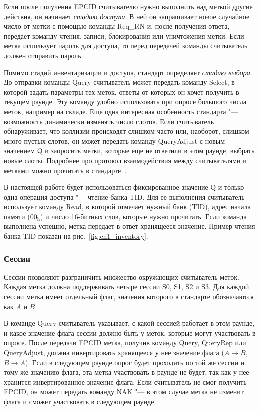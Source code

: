 Если после получения EPCID считывателю нужно выполнить над меткой другие действия, он начинает \textit{стадию доступа}. В ней он запрашивает новое случайное число от метки с помощью команды Req\_RN и, после получения ответа, передает команду чтения, записи, блокирования или уничтожения метки. Если метка использует пароль для доступа, то перед передачей команды считыватель должен отправить пароль.

Помимо стадий инвентаризации и доступа, стандарт определяет \textit{стадию выбора}. До отправки команды Query считыватель может передать команду Select, в которой задать параметры тех меток, ответы от которых он хочет получить в текущем раунде. Эту команду удобно использовать при опросе большого числа меток, например на складе. Еще одна интересная особенность стандарта "--- возможность динамически изменять число слотов. Если считыватель обнаруживает, что коллизии происходят слишком часто или, наоборот, слишком много пустых слотов, он может передать команду QueryAdjust с новым значением Q и запросить метки, которые еще не ответили в этом раунде, выбрать новые слоты. Подробнее про протокол взаимодействия между считывателями и метками можно прочитать в стандарте~\cite{StdGen2}.

В настоящей работе будет использоваться фиксированное значение Q и только одна операция доступа "--- чтение банка TID. Для ее выполнения считыватель использует команду Read, в которой отмечает нужный банк (TID), адрес начала памяти ($\text{00}_\text{h}$) и число 16-битных слов, которые нужно прочитать. Если команда выполнена успешно, метка передает в ответ хранящееся значение. Пример чтения банка TID показан на рис.~\ref{fig:ch1_inventory}.



\subsubsection{Сессии}

Сессии позволяют разграничить множество окружающих считыватель меток. Каждая метка должна поддерживать четыре сессии S0, S1, S2 и S3. Для каждой сессии метка имеет отдельный флаг, значения которого в стандарте обозначаются как $A$ и $B$.

В команде Query считыватель указывает, с какой сессией работает в этом раунде, и какое значение флага сессии должно быть у меток, которые могут участвовать в опросе. После передачи EPCID метка, получив команду Query, QueryRep или QueryAdjust, должна инвертировать хранящееся у нее значение флага ($A \rightarrow B$, $B \rightarrow A$). Если в следующем раунде опрос будет проходить по той же сессии и тому же значению флага, эта метка участвовать в раунде не будет, так как у нее хранится инвертированное значение флага. Если считыватель не смог получить EPCID, он может передать команду NAK "--- в этом случае метка не изменит флага и сможет участвовать в следующем раунде.

